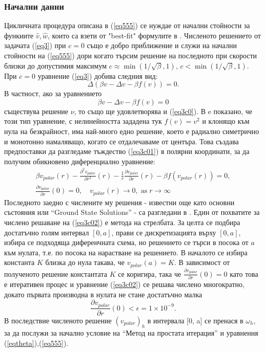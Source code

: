 \documentclass{article}
\newcommand{\be}{\begin{equation}}
\newcommand{\ee}{\end{equation}}
\newcommand{\rf}[1]{(\ref{#1})}
\theoremstyle{remark}
\begin{document}
\subsubsection{Начални данни}
 Цикличната процедура описана в \rf{eq555} се нуждае от начални стойности за функиите $\widehat{v},\widehat{w}$, които са взети от "best-fit" формулите в \cite{Ch2011}. 
Численото решението от задачата \rf{eq3} при $c=0$ също е добро приближение и служи на начални стойности на \rf{eq555} дори когато търсим решение на последното при скорости близки до допустимия максимум $c \approx \min (1/ \sqrt{\beta},1)$, $c < \min (1/ \sqrt{\beta},1)$. При $c=0$ уравнение \rf{eq3} добива следния вид:
\be\label{eq3c0}
\Delta (\beta  v - \Delta v - \beta f(v)) = 0.
\ee
В частност, ако за уравнението 
\be\label{eq3c01}
\beta v - \Delta v - \beta f(v) = 0
\ee
съществува решение $\nu$, то също ще удовлетворява и \rf{eq3c0}.  В \cite{ref1c00} e показано, че този тип уравнение, с нелинейността зададена тук $f(v) = v^2$ и клонящо към нула на безкрайност, има най-много едно решение, което е радиално симетрично и монотонно намаляващо, когато се отдалечаваме от центъра. Това създава предпоставки да разгледаме тъждество \rf{eq3c01} в полярни координати, за да получим обикновено диференциално уравнение:
\begin{align}\label{eq3c02}
\beta v_{polar}(r)  - \frac{ \partial^2 v_{polar} } {\partial r^2}(r) - \frac{1}{r} \frac{ \partial v_{polar} } {\partial r}(r)  - \beta f(v_{polar}(r)) = 0, \nonumber \\
\frac{ \partial v_{polar} } {\partial r}(0) = 0, \quad v_{polar}(r) \rightarrow 0, \; \text{as} \; r \rightarrow \infty
\end{align}
Последното заедно с числените му решения - известни още като основни състояния или ``Ground State Solutions'' - са разгледани в \cite{ref1c0, ref2c0}. Един от похватите за числено решаване на \rf{eq3c02} е метода на стрелбата. За целта се подбира достатъчно голям интервал $[0, a]$, прави се дискретизацията върху $[0, a]$, избира се подходяща диференчната схема, но решението се търси в посока от $a$ към нулата, т.е. по посока на нарастване на решението. В началото се избира константа $K$ близка до нула такава, че $v_{polar}(a) = K$. В зависимост от полученото решение константата $K$ се коригира, така че $\frac{ \partial v_{polar} } {\partial r}(0) = 0$ като това е итеративен процес и уравнение \rf{eq3c02} се решава числено многократно, докато първата производна в нулата не стане достатъчно малка $$\frac{ \partial v_{polar} } {\partial r}(0) < \epsilon = 1\times10^{-9}.$$ В последствие численото решение $(v_{polar})_h$ в интервала [0, a] се пренася в $\omega_h$, за да послужи за начално условие на ``Метод на простата итерация'' и уравнения \rf{eqtheta},\rf{eq555}.
\end{document}

